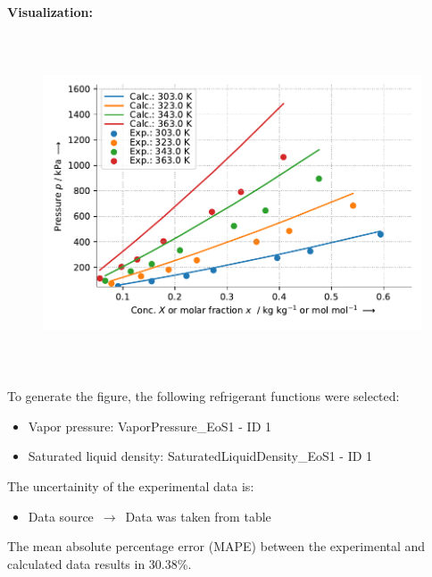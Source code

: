 \textbf{Visualization:}
%
\begin{figure}[!htp]
{\noindent\includegraphics[height=10cm, keepaspectratio]{figs/abs/abs_R-134a_pentaerythritol_tetrapentanoate_ester__FloryHuggins_1.pdf}}
\end{figure}
%

To generate the figure, the following refrigerant functions were selected:
\begin{itemize}
\item Vapor pressure: VaporPressure\_EoS1 - ID 1
\item Saturated liquid density: SaturatedLiquidDensity\_EoS1 - ID 1
\end{itemize}

The uncertainity of the experimental data is:
\begin{itemize}
\item Data source $\,\to\,$ Data was taken from table
\end{itemize}

The mean absolute percentage error (MAPE) between the experimental and calculated data results in 30.38\%.
\FloatBarrier
\newpage
